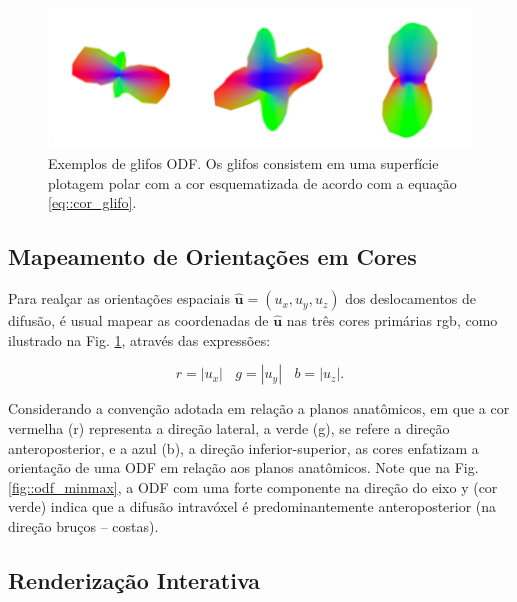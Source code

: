 \documentclass[
    12pt,                %
    oneside,            %
    a4paper,            %
    english,            %
    french,                %
    spanish,            %
    brazil                %
    ]{abntex2}
\begin{document}
\begin{figure}[ht]
    \centering
    \includegraphics[width=.8\linewidth, angle=0]{figs/Esquema_Glifo/Glifos3Ex.png}
    \caption{Exemplos de glifos ODF. Os glifos consistem em uma superfície plotagem polar com a cor esquematizada de acordo com a equação \ref{eq::cor_glifo}.}
    \label{fig::glifo_ilustrado}
   \hspace{1pt}
\end{figure}

\subsection{Mapeamento de Orientações em Cores}

Para realçar as orientações espaciais $\mathbf{\hat{u}} = (u_x, u_y, u_z)$  dos deslocamentos de difusão, é usual mapear as coordenadas de $\mathbf{\hat{u}}$ nas três cores primárias rgb, como ilustrado na Fig. \ref{fig::glifo_ilustrado}, através das expressões:

\begin{equation}
\label{eq::cor_glifo}
    r = |u_x| ~~~~ g = |u_y| ~~~~ b = |u_z|. 
\end{equation}

Considerando a convenção adotada em relação a planos anatômicos, em que a cor vermelha (r) representa a direção lateral, a verde (g), se refere a direção anteroposterior, e a azul (b), a direção inferior-superior, as
 cores enfatizam a orientação de uma ODF em relação aos planos anatômicos. Note que na Fig. \ref{fig::odf_minmax}, a ODF com uma forte componente na direção do eixo y (cor verde) indica que a difusão intravóxel é predominantemente anteroposterior (na direção bruços -- costas).

\subsection{Renderização Interativa}
\end{document}
